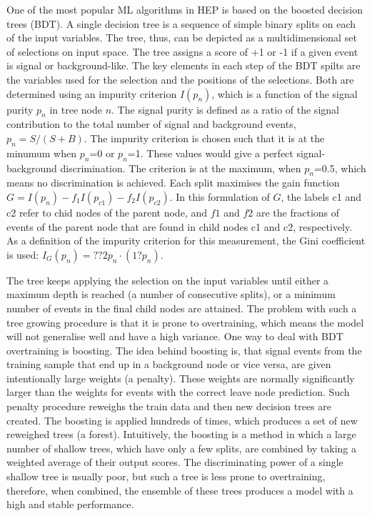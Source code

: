 One of the most popular ML algorithms in HEP is based on the boosted decision trees (BDT). A single decision tree is a sequence of simple binary splits on each of the input variables. The tree, thus, can be depicted as a multidimensional set of selections on input space. The tree assigns a score of +1 or -1 if a given event is signal or background-like. The key elements in each step of the BDT spilts are the variables used for the selection and the positions of the selections. Both are determined using an impurity criterion $I(p_n)$, which is a function of the signal purity $p_n$ in tree node $n$. The signal purity is defined as a ratio of the signal contribution to the total number of signal and background events, $p_n = S/(S+B)$. The impurity criterion is chosen such that it is at the minumum when $p_n$=0 or $p_n$=1. These values would give a perfect signal-background discrimination. The criterion is at the maximum, when $p_n$=0.5, which means no discrimination is achieved. 
Each split maximises the gain function $G=I(p_n) - f_1I(p_{c1})-f_2I(p_{c2})$. In this formulation of $G$, the labels c1 and c2 refer to chid nodes of the parent node, and $f1$ and $f2$ are the fractions of events of the parent node that are found in child nodes c1 and c2, respectively. As a definition of the impurity criterion for this measurement, the Gini coefficient is used: $I_G(p_n) = ??2 p_n \cdot (1?p_n)$. 

The tree keeps applying the selection on the input variables until either a maximum depth is reached (a number of consecutive splits), or a minimum number of events in the final child nodes are attained. The problem with such a tree growing procedure is that it is prone to overtraining, which means the model will not generalise well and have a high variance. One way to deal with BDT overtraining is boosting. 
The idea behind boosting is, that signal events
 from the training sample that end up in a background node or vice versa, are given intentionally large weights (a penalty). These weights are normally significantly larger than the weights for events with
 the correct leave node prediction. Such penalty procedure reweighs the train data and then new decision trees are created. The boosting is applied hundreds of times, which produces a set of new reweighed trees (a forest). Intuitively, the boosting is a method in which a large number of shallow trees, which have only a few splits, are combined by taking a weighted average of their output scores. The discriminating power of a single shallow tree is usually poor, but such a tree is less prone to overtraining, therefore, when combined, the ensemble of these trees produces a model with a high and stable performance.
 
